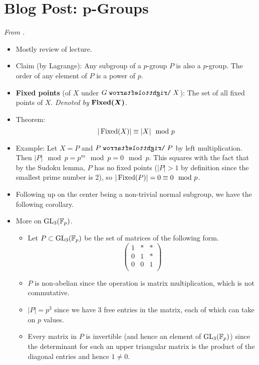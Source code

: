 \documentclass[../notes.tex]{subfiles}
\begin{document}
\section[Blog Post: \texorpdfstring{$p$}{TEXT}-Groups]{\texorpdfstring{Blog Post: $\bm{p}$}{TEXT}-Groups}
\emph{From \textcite{bib:Calegari}.}
\begin{itemize}
    \item {}Mostly review of lecture.
    \item Claim (by Lagrange): Any subgroup of a $p$-group $P$ is also a $p$-group. The order of any element of $P$ is a power of $p$.
    \item \textbf{Fixed points} (of $X$ under $G\acts X$): The set of all fixed points of $X$. \emph{Denoted by} $\bm{\Fixed(X)}$.
    \item Theorem:
    \begin{equation*}
        |\operatorname{Fixed}(X)| \equiv |X|\mod p
    \end{equation*}
    \item Example: Let $X=P$ and $P\acts P$ by left multiplication. Then $|P|\mod p=p^m\mod p=0\mod p$. This squares with the fact that by the Sudoku lemma, $P$ has no fixed points ($|P|>1$ by definition since the smallest prime number is 2), so $|\operatorname{Fixed}(P)|=0\equiv 0\mod p$.
    \item Following up on the center being a non-trivial normal subgroup, we have the following corollary.
    \item More on $\text{GL}_3(\mathbb{F}_p)$.
    \begin{itemize}
        \item Let $P\subset\text{GL}_3(\mathbb{F}_p)$ be the set of matrices of the following form.
        \begin{equation*}
            \begin{pmatrix}
                1 & * & *\\
                0 & 1 & *\\
                0 & 0 & 1\\
            \end{pmatrix}
        \end{equation*}
        \item $P$ is non-abelian since the operation is matrix multiplication, which is not commutative.
        \item $|P|=p^3$ since we have 3 free entries in the matrix, each of which can take on $p$ values.
        \item Every matrix in $P$ is invertible (and hence an element of $\text{GL}_3(\mathbb{F}_p)$) since the determinant for such an upper triangular matrix is the product of the diagonal entries and hence $1\neq 0$.

\end{itemize}
\end{itemize}
\end{document}
